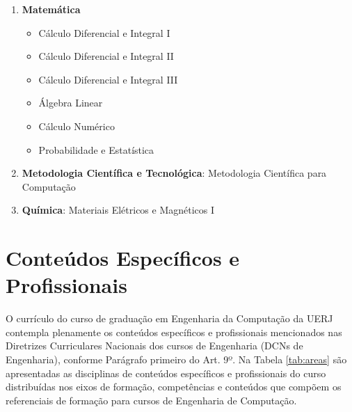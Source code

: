 \begin{enumerate}
    \item \textbf{Matemática}  
    \begin{itemize}
        \item Cálculo Diferencial e Integral I
        \item Cálculo Diferencial e Integral II
        \item Cálculo Diferencial e Integral III
        \item Álgebra Linear
        \item Cálculo Numérico
        \item Probabilidade e Estatística
    \end{itemize}

    \item \textbf{Metodologia Científica e Tecnológica}: Metodologia Científica para Computação   

    \item \textbf{Química}: Materiais Elétricos e Magnéticos I
\end{enumerate}


\section{Conteúdos Específicos e Profissionais}


O currículo do curso de graduação em Engenharia da Computação da UERJ contempla plenamente os conteúdos específicos e profissionais mencionados nas Diretrizes Curriculares Nacionais dos cursos de Engenharia (DCNs de Engenharia), conforme Parágrafo primeiro do Art. 9º. Na Tabela \ref{tab:areas} são apresentadas as disciplinas de conteúdos específicos e profissionais do curso distribuídas nos eixos de formação, competências e conteúdos que compõem os referenciais de formação para cursos de Engenharia de Computação.




